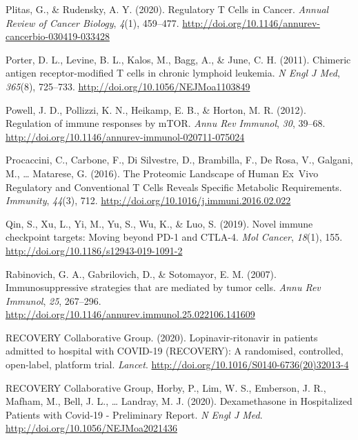 \documentclass[12pt,twoside,openany,\mydriver]{thesis}  %
\begin{document}
\leavevmode\hypertarget{ref-plitas_regulatory_2020}{}%
Plitas, G., \& Rudensky, A. Y. (2020). Regulatory T Cells in Cancer. \emph{Annual Review of Cancer Biology}, \emph{4}(1), 459--477. \url{http://doi.org/10.1146/annurev-cancerbio-030419-033428}

\leavevmode\hypertarget{ref-porter_chimeric_2011}{}%
Porter, D. L., Levine, B. L., Kalos, M., Bagg, A., \& June, C. H. (2011). Chimeric antigen receptor-modified T cells in chronic lymphoid leukemia. \emph{N Engl J Med}, \emph{365}(8), 725--733. \url{http://doi.org/10.1056/NEJMoa1103849}

\leavevmode\hypertarget{ref-powell_regulation_2012}{}%
Powell, J. D., Pollizzi, K. N., Heikamp, E. B., \& Horton, M. R. (2012). Regulation of immune responses by mTOR. \emph{Annu Rev Immunol}, \emph{30}, 39--68. \url{http://doi.org/10.1146/annurev-immunol-020711-075024}

\leavevmode\hypertarget{ref-procaccini_proteomic_2016}{}%
Procaccini, C., Carbone, F., Di Silvestre, D., Brambilla, F., De Rosa, V., Galgani, M., \ldots{} Matarese, G. (2016). The Proteomic Landscape of Human Ex~Vivo Regulatory and Conventional T Cells Reveals Specific Metabolic Requirements. \emph{Immunity}, \emph{44}(3), 712. \url{http://doi.org/10.1016/j.immuni.2016.02.022}

\leavevmode\hypertarget{ref-qin_novel_2019}{}%
Qin, S., Xu, L., Yi, M., Yu, S., Wu, K., \& Luo, S. (2019). Novel immune checkpoint targets: Moving beyond PD-1 and CTLA-4. \emph{Mol Cancer}, \emph{18}(1), 155. \url{http://doi.org/10.1186/s12943-019-1091-2}

\leavevmode\hypertarget{ref-rabinovich_immunosuppressive_2007}{}%
Rabinovich, G. A., Gabrilovich, D., \& Sotomayor, E. M. (2007). Immunosuppressive strategies that are mediated by tumor cells. \emph{Annu Rev Immunol}, \emph{25}, 267--296. \url{http://doi.org/10.1146/annurev.immunol.25.022106.141609}

\leavevmode\hypertarget{ref-recovery_collaborative_group_lopinavir-ritonavir_2020}{}%
RECOVERY Collaborative Group. (2020). Lopinavir-ritonavir in patients admitted to hospital with COVID-19 (RECOVERY): A randomised, controlled, open-label, platform trial. \emph{Lancet}. \url{http://doi.org/10.1016/S0140-6736(20)32013-4}

\leavevmode\hypertarget{ref-recovery_collaborative_group_dexamethasone_2020}{}%
RECOVERY Collaborative Group, Horby, P., Lim, W. S., Emberson, J. R., Mafham, M., Bell, J. L., \ldots{} Landray, M. J. (2020). Dexamethasone in Hospitalized Patients with Covid-19 - Preliminary Report. \emph{N Engl J Med}. \url{http://doi.org/10.1056/NEJMoa2021436}
\end{document}
